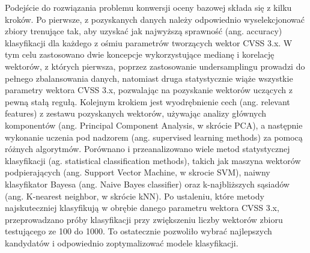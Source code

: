 \bigbreak
Podejście do rozwiązania problemu konwersji oceny bazowej składa się z kilku kroków. Po pierwsze, z pozyskanych danych należy odpowiednio wyselekcjonować zbiory trenujące tak, aby uzyskać jak najwyższą sprawność (ang. accuracy) klasyfikacji dla każdego z ośmiu parametrów tworzących wektor CVSS 3.x. W tym celu zastosowano dwie koncepcje wykorzystujące medianę i korelację wektorów, z których pierwsza, poprzez zastosowanie undersamplingu prowadzi do pełnego zbalansowania danych, natomiast druga statystycznie wiąże wszystkie parametry wektora CVSS 3.x, pozwalając na pozyskanie wektorów uczących z pewną stałą regułą. Kolejnym krokiem jest wyodrębnienie cech (ang. relevant features) z zestawu pozyskanych wektorów, używając analizy głównych komponentów (ang. Principal Component Analysis, w skrócie PCA), a następnie wykonanie uczenia pod nadzorem (ang. supervised learning methods) za pomocą różnych algorytmów. Porównano i przeanalizowano wiele metod statystycznej klasyfikacji (ag. statistical classification methods), takich jak maszyna wektorów podpierających (ang. Support Vector Machine, w skrocie SVM), naiwny klasyfikator Bayesa (ang. Naive Bayes classifier) oraz k-najbliższych sąsiadów (ang. K-nearest neighbor, w skrócie kNN). Po ustaleniu, które metody najskuteczniej klasyfikują w obrębie danego parametru wektora CVSS 3.x, przeprowadzano próby klasyfikacji przy zwiększeniu liczby wektorów zbioru testującego ze 100 do 1000. To ostatecznie pozwoliło wybrać najlepszych kandydatów i odpowiednio zoptymalizować modele klasyfikacji.

